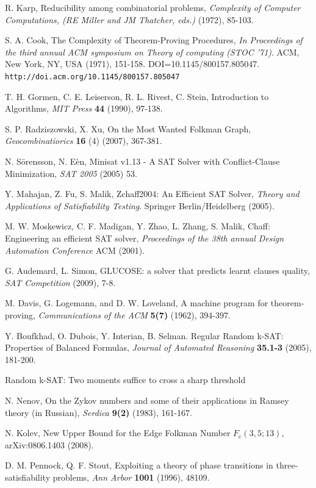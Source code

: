 \documentclass[paper=a4, fontsize=11pt]{scrartcl} %
\begin{document}
\begin{thebibliography}{9}

 R. Karp, Reducibility among combinatorial problems, \emph{Complexity of Computer Computations, (RE Miller and JM Thatcher, eds.)} (1972), 85-103.

 S. A. Cook, The Complexity of Theorem-Proving Procedures, \emph{In Proceedings of the third annual ACM symposium on Theory of computing (STOC '71)}. ACM, New York, NY, USA (1971), 151-158. DOI=10.1145/800157.805047. {\tt http://doi.acm.org/10.1145/800157.805047}

 T. H. Gormen, C. E. Leiserson, R. L. Rivest, C. Stein, Introduction to Algorithms, \emph{MIT Press} \textbf{44} (1990), 97-138.

 S. P. Radziszowski, X. Xu, On the Most Wanted Folkman Graph, \emph{Geocombinatiorics} \textbf{16} (4) (2007), 367-381.

 N. S\"{o}rensson, N. E\`{e}n, Minisat v1.13 - A SAT Solver with Conflict-Clause Minimization, \emph{SAT 2005} (2005) 53.

 Y. Mahajan, Z. Fu, S. Malik, Zchaff2004: An Efficient SAT Solver, \emph{Theory and Applications of Satisfiability Testing}. Springer Berlin/Heidelberg (2005).

 M. W. Moskewicz, C. F. Madigan, Y. Zhao, L. Zhang, S. Malik, Chaff: Engineering an efficient SAT solver, \emph{Proceedings of the 38th annual Design Automation Conference} ACM (2001).

 G. Audemard, L. Simon, GLUCOSE: a solver that predicts learnt clauses quality, \emph{SAT Competition} (2009), 7-8.

 M. Davis, G. Logemann, and D. W. Loveland, A machine program for theorem-proving, \emph{Communications of the ACM} \textbf{5(7)} (1962), 394-397.

 Y. Boufkhad, O. Dubois, Y. Interian, B. Selman. Regular Random k-SAT: Properties of Balanced Formulas, \emph{Journal of Automated Reasoning} \textbf{35.1-3} (2005), 181-200.

 Random k-SAT: Two moments suffice to cross a sharp threshold

 N. Nenov, On the Zykov numbers and some of their applications in Ramsey theory (in Russian), \emph{Serdica} \textbf{9(2)} (1983), 161-167.

 N. Kolev, New Upper Bound for the Edge Folkman Number $F_e(3,5;13)$, arXiv:0806.1403 (2008).

 D. M. Pennock, Q. F. Stout, Exploiting a theory of phase transitions in three-satisfiability problems, \emph{Ann Arbor} \textbf{1001} (1996), 48109.

\end{thebibliography}
\end{document}
